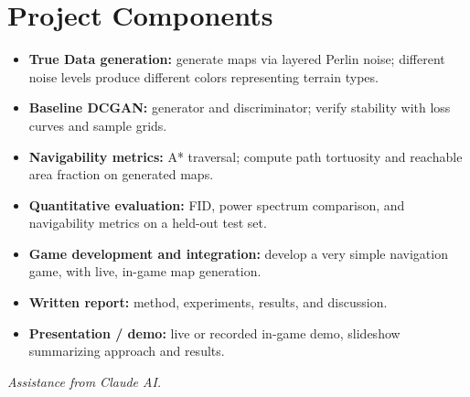 \documentclass{article}
\begin{document}
\section*{Project Components}

\begin{itemize}[leftmargin=1.5em, topsep=2pt, itemsep=0pt]
    \item \textbf{True Data generation:} generate maps via layered Perlin noise; different noise levels produce different colors representing terrain types.
    \item \textbf{Baseline DCGAN:} generator and discriminator; verify stability with loss curves and sample grids.
    \item \textbf{Navigability metrics:} A* traversal; compute path tortuosity and reachable area fraction on generated maps.
    \item \textbf{Quantitative evaluation:} FID, power spectrum comparison, and navigability metrics on a held-out test set.
    \item \textbf{Game development and integration:} develop a very simple navigation game, with live, in-game map generation.
    \item \textbf{Written report:} method, experiments, results, and discussion.
    \item \textbf{Presentation / demo:} live or recorded in-game demo, slideshow summarizing approach and results.
\end{itemize}

\vspace{1em}
\noindent\small\textit{Assistance from Claude AI.}
\end{document}
